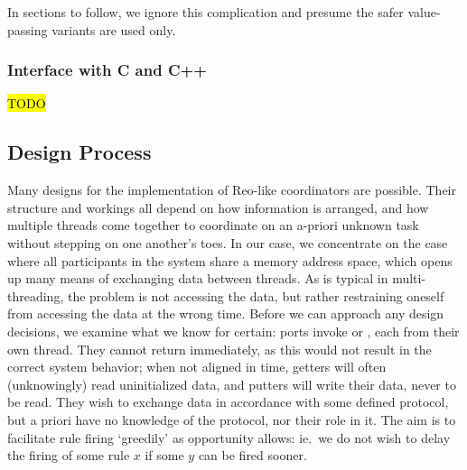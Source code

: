 In sections to follow, we ignore this complication and presume the safer value-passing variants are used only.

\subsubsection{Interface with C and C++}
\hl{TODO}

\subsection{Design Process}
\label{sec:chosen_design}
Many designs for the implementation of Reo-like coordinators are possible. Their structure and workings all depend on how information is arranged, and how multiple threads come together to coordinate on an a-priori unknown task without stepping on one another's toes. In our case, we concentrate on the case where all participants in the system share a memory address space, which opens up many means of exchanging data between threads. As is typical in multi-threading, the problem is not accessing the data, but rather restraining oneself from accessing the data at the wrong time. Before we can approach any design decisions, we examine what we know for certain: ports invoke  or , each from their own thread. They cannot return immediately, as this would not result in the correct system behavior; when not aligned in time, getters will often (unknowingly) read uninitialized data, and putters will write their data, never to be read. They wish to exchange data in accordance with some defined protocol, but a priori have no knowledge of the protocol, nor their role in it. The aim is to facilitate rule firing `greedily' as opportunity allows: ie.\ we do not wish to delay the firing of some rule $x$ if some $y$ can be fired sooner.

